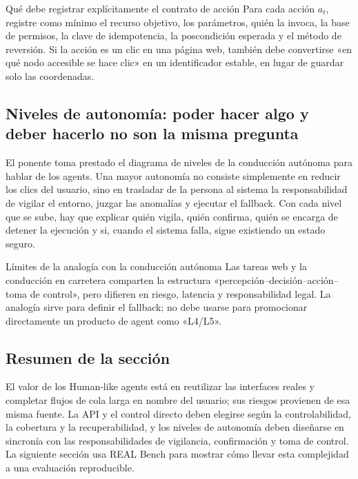 
\begin{importantbox}{Qué debe registrar explícitamente el contrato de acción}
Para cada acción $a_t$, registre como mínimo el recurso objetivo, los parámetros, quién la invoca, la base de permisos, la clave de idempotencia, la poscondición esperada y el método de reversión. Si la acción es un clic en una página web, también debe convertirse «en qué nodo accesible se hace clic» en un identificador estable, en lugar de guardar solo las coordenadas.
\end{importantbox}

\subsection{Niveles de autonomía: poder hacer algo y deber hacerlo no son la misma pregunta}

El ponente toma prestado el diagrama de niveles de la conducción autónoma para hablar de los agents. Una mayor autonomía no consiste simplemente en reducir los clics del usuario, sino en trasladar de la persona al sistema la responsabilidad de vigilar el entorno, juzgar las anomalías y ejecutar el fallback. Con cada nivel que se sube, hay que explicar quién vigila, quién confirma, quién se encarga de detener la ejecución y si, cuando el sistema falla, sigue existiendo un estado seguro.


\begin{warningbox}{Límites de la analogía con la conducción autónoma}
Las tareas web y la conducción en carretera comparten la estructura «percepción--decisión--acción--toma de control», pero difieren en riesgo, latencia y responsabilidad legal. La analogía sirve para definir el fallback; no debe usarse para promocionar directamente un producto de agent como «L4/L5».
\end{warningbox}

\subsection{Resumen de la sección}

El valor de los Human-like agents está en reutilizar las interfaces reales y completar flujos de cola larga en nombre del usuario; sus riesgos provienen de esa misma fuente. La API y el control directo deben elegirse según la controlabilidad, la cobertura y la recuperabilidad, y los niveles de autonomía deben diseñarse en sincronía con las responsabilidades de vigilancia, confirmación y toma de control. La siguiente sección usa REAL Bench para mostrar cómo llevar esta complejidad a una evaluación reproducible.
